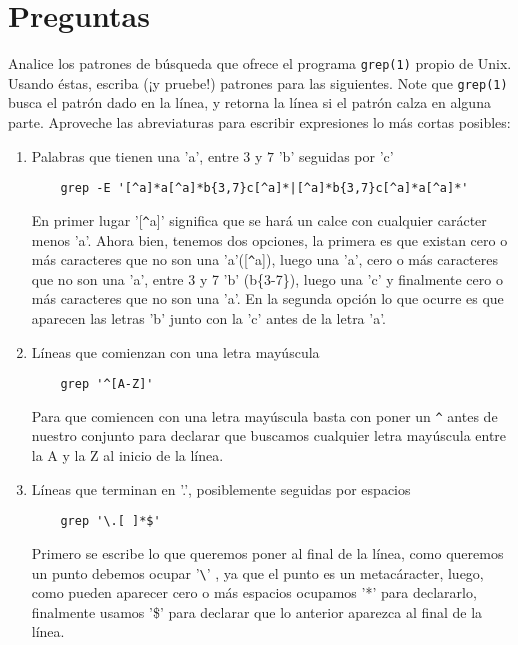 \documentclass[spanish, fleqn]{article}
\title{Informática Teórica\\
       Tarea \#\num \\
       ``¡Precalentamiento!''}
\author{Andrés Navarro \\ 201673001-K}
\date{4 de septiembre de 2017}
\begin{document}
\maketitle
\thispagestyle{empty}

\section*{Preguntas}

  Analice los patrones de búsqueda que ofrece el programa \texttt{grep(1)}
  propio de Unix.
  Usando éstas,
  escriba
  (¡y pruebe!)
  patrones para las siguientes.
  Note que \texttt{grep(1)} busca el patrón dado en la línea,
  y retorna la línea si el patrón calza en alguna parte.
  Aproveche las abreviaturas para escribir expresiones
  lo más cortas posibles:
  \begin{enumerate}
  \item
    Palabras que tienen una 'a', entre \(3\) y \(7\) 'b' seguidas por 'c'
  	\begin{verbatim}
    grep -E '[^a]*a[^a]*b{3,7}c[^a]*|[^a]*b{3,7}c[^a]*a[^a]*'
    \end{verbatim}
    En primer lugar '[\verb+^+a]' significa que se hará un calce con cualquier carácter menos 'a'. Ahora bien, tenemos dos opciones, la primera es que existan cero o más caracteres que no son una 'a'([\verb+^+a]), luego una 'a', cero o más caracteres que no son una 'a', entre 3 y 7 'b' (b\{3-7\}), luego una 'c' y finalmente cero o más caracteres que no son una 'a'. En la segunda opción lo que ocurre es que aparecen las  letras 'b' junto con la 'c' antes de la letra 'a'.
  
  \item
    Líneas que comienzan con una letra mayúscula
    \begin{verbatim}
    grep '^[A-Z]'
    \end{verbatim}
    Para que comiencen con una letra mayúscula basta con poner un \verb+^+ antes de nuestro conjunto para declarar que buscamos cualquier letra mayúscula entre la A y la Z al inicio de la línea.
    
  \item
    Líneas que terminan en '.',
    posiblemente seguidas por espacios
    \begin{verbatim}
    grep '\.[ ]*$'
    \end{verbatim}    
    Primero se escribe lo que queremos poner al final de la línea, como queremos un punto debemos ocupar '\verb+\+' , ya que el punto es un metacáracter, luego, como pueden aparecer cero o más espacios ocupamos  '*'  para declararlo, finalmente usamos '\$' para declarar que lo anterior aparezca al final de la línea.
  

\end{enumerate}
\end{document}
